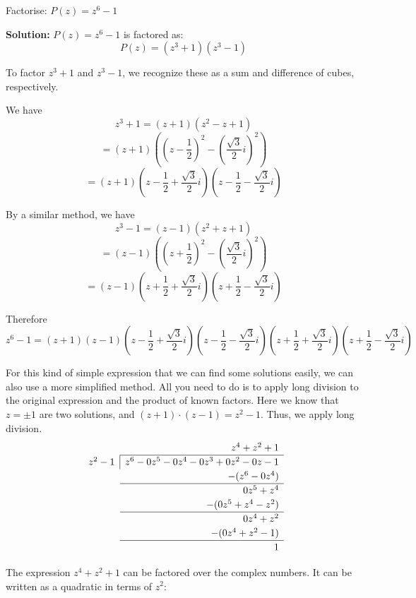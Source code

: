 \documentclass[
	12pt, %
	fleqn, %
	a4paper, %
]{LegrandOrangeBook}
\begin{document}
\begin{example}
    Factorise: \( P(z) = z^6 - 1 \)
\end{example}
\textbf{Solution:}
\( P(z) = z^6 - 1 \) is factored as:
\[ P(z) = (z^3 + 1)(z^3 - 1) \]

To factor \( z^3 + 1 \) and \( z^3 - 1 \), we recognize these as a sum and difference of cubes, respectively.

We have
\[ z^3 + 1 = (z + 1)\left(z^2 - z + 1\right) \]
\[ = (z + 1)\left(\left(z - \frac{1}{2}\right)^2 - \left(\frac{\sqrt{3}}{2}i\right)^2\right) \]
\[ = (z + 1)\left(z - \frac{1}{2} + \frac{\sqrt{3}}{2}i\right)\left(z - \frac{1}{2} - \frac{\sqrt{3}}{2}i\right) \]

By a similar method, we have
\[ z^3 - 1 = (z - 1)\left(z^2 + z + 1\right) \]
\[ = (z - 1)\left(\left(z + \frac{1}{2}\right)^2 - \left(\frac{\sqrt{3}}{2}i\right)^2\right) \]
\[ = (z - 1)\left(z + \frac{1}{2} + \frac{\sqrt{3}}{2}i\right)\left(z + \frac{1}{2} - \frac{\sqrt{3}}{2}i\right) \]

Therefore
\[ z^6 - 1 = (z + 1)(z - 1)\left(z - \frac{1}{2} + \frac{\sqrt{3}}{2}i\right)\left(z - \frac{1}{2} - \frac{\sqrt{3}}{2}i\right)\left(z + \frac{1}{2} + \frac{\sqrt{3}}{2}i\right)\left(z + \frac{1}{2} - \frac{\sqrt{3}}{2}i\right) \]

For this kind of simple expression that we can find some solutions easily, we can also use a more
    simplified method. All you need to do is to apply long division to the original expression and the product
    of known factors. Here we know that $z=\pm1$ are two solutions, and $(z+1)\cdot(z-1) = z^2 - 1$. Thus, we apply long division.
    \[
\renewcommand\arraystretch{1.2}
\begin{array}{r|l}
\multicolumn{2}{r}{z^4 + z^2 + 1} \\
\cline{2-2}
z^2 - 1 & z^6 - 0z^5 - 0z^4 - 0z^3 + 0z^2 - 0z - 1 \\
\multicolumn{2}{r}{- (z^6 - 0z^4)} \\
\cline{2-2}
\multicolumn{2}{r}{0z^5 + z^4} \\
\multicolumn{2}{r}{- (0z^5 + z^4 - z^2)} \\
\cline{2-2}
\multicolumn{2}{r}{0z^4 + z^2} \\
\multicolumn{2}{r}{- (0z^4 + z^2 - 1)} \\
\cline{2-2}
\multicolumn{2}{r}{1} \\
\end{array}
\]

The expression \( z^4 + z^2 + 1 \) can be factored over the complex numbers. It can be written as a quadratic in terms of \( z^2 \):
\end{document}
